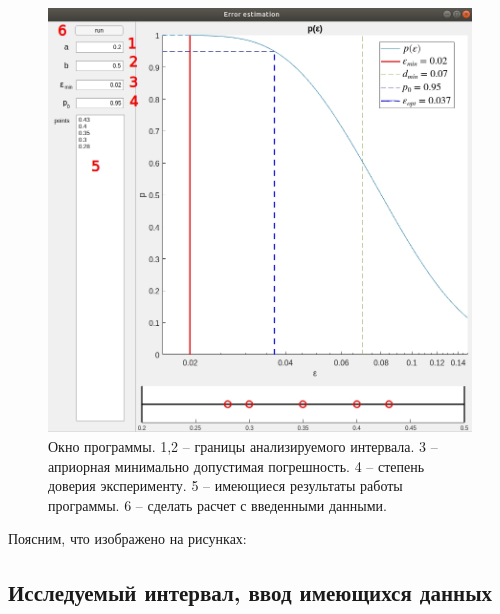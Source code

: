 \documentclass[a4paper,12pt]{article} %
\begin{document}
\begin{figure}[h!]
\begin{center}
\includegraphics[width=1\textwidth]{./pics/whole_window_nums}
\end{center}
\caption{Окно программы. 1,2 -- границы анализируемого интервала. 3 -- априорная минимально допустимая погрешность. 4 -- степень доверия эксперименту. 5 -- имеющиеся результаты работы программы. 6 -- сделать расчет с введенными данными.} \label{img:whole_window}
\end{figure}

\newpage

Поясним, что изображено на рисунках:

\subsection{Исследуемый интервал, ввод имеющихся данных}
\end{document}
